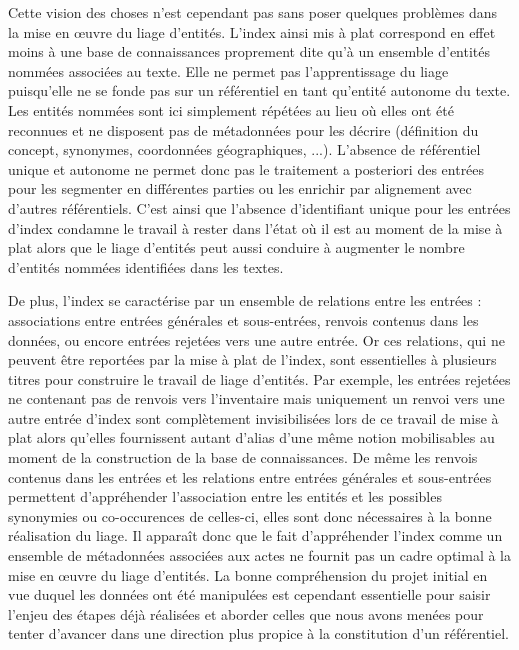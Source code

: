 \documentclass[a4paper,12pt,twoside]{book}
\begin{document}
	Cette vision des choses n'est cependant pas sans poser quelques problèmes dans la mise en œuvre du liage d'entités. L'index ainsi mis à plat correspond en effet moins à une base de connaissances proprement dite qu'à un ensemble d'entités nommées associées au texte. Elle ne permet pas l'apprentissage du liage puisqu'elle ne se fonde pas sur un référentiel en tant qu'entité autonome du texte. Les entités nommées sont ici simplement répétées au lieu où elles ont été reconnues et ne disposent pas de métadonnées pour les décrire (définition du concept, synonymes, coordonnées géographiques, ...). L'absence de référentiel unique et autonome ne permet donc pas le traitement a posteriori des entrées pour les segmenter en différentes parties ou les enrichir par alignement avec d'autres référentiels. C'est ainsi que l'absence d'identifiant unique pour les entrées d'index condamne le travail à rester dans l'état où il est au moment de la mise à plat alors que le liage d'entités peut aussi conduire à augmenter le nombre d'entités nommées identifiées dans les textes.
	
	De plus, l'index se caractérise par un ensemble de relations entre les entrées : associations entre entrées générales et sous-entrées, renvois contenus dans les données, ou encore entrées rejetées vers une autre entrée. Or ces relations, qui ne peuvent être reportées par la mise à plat de l'index, sont essentielles à plusieurs titres pour construire le travail de liage d'entités.  Par exemple, les entrées rejetées ne contenant pas de renvois vers l'inventaire mais uniquement un renvoi vers une autre entrée d'index sont complètement invisibilisées lors de ce travail de mise à plat alors qu'elles fournissent autant d'alias d'une même notion mobilisables au moment de la construction de la base de connaissances. De même les renvois contenus dans les entrées et les relations entre entrées générales et sous-entrées permettent d'appréhender l'association entre les entités et les possibles synonymies ou co-occurences de celles-ci, elles sont donc nécessaires à la bonne réalisation du liage. Il apparaît donc que le fait d'appréhender l'index comme un ensemble de métadonnées associées aux actes ne fournit pas un cadre optimal à la mise en œuvre du liage d'entités. La bonne compréhension du projet initial en vue duquel les données ont été manipulées est cependant essentielle pour saisir l'enjeu des étapes déjà réalisées et aborder celles que nous avons menées pour tenter d'avancer dans une direction plus propice à la constitution d'un référentiel.
	
\end{document}
